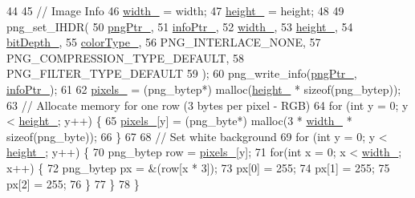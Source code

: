 \begin{DoxyCode}
44 
45     \textcolor{comment}{// Image Info}
46     \mbox{\hyperlink{class_image_a4c2d8a01ecf1b7438f57f93357080e08}{width\_}} = width;
47     \mbox{\hyperlink{class_image_a64a699c5bb8e8a18c6971a8032806dba}{height\_}} = height;
48 
49     png\_set\_IHDR(
50         \mbox{\hyperlink{class_image_aaf607d2596bac09b13370599d9ba6d8c}{pngPtr\_}}, 
51         \mbox{\hyperlink{class_image_a505878e5e19500e3cc1b940067faa584}{infoPtr\_}}, 
52         \mbox{\hyperlink{class_image_a4c2d8a01ecf1b7438f57f93357080e08}{width\_}}, 
53         \mbox{\hyperlink{class_image_a64a699c5bb8e8a18c6971a8032806dba}{height\_}}, 
54         \mbox{\hyperlink{class_image_ae472f0390f64eb5d49f858ce95e09ce8}{bitDepth\_}}, 
55         \mbox{\hyperlink{class_image_a94b0dece808a9f06ebb6f4394e8e3048}{colorType\_}}, 
56         PNG\_INTERLACE\_NONE, 
57         PNG\_COMPRESSION\_TYPE\_DEFAULT, 
58         PNG\_FILTER\_TYPE\_DEFAULT
59     );
60     png\_write\_info(\mbox{\hyperlink{class_image_aaf607d2596bac09b13370599d9ba6d8c}{pngPtr\_}}, \mbox{\hyperlink{class_image_a505878e5e19500e3cc1b940067faa584}{infoPtr\_}});
61 
62     \mbox{\hyperlink{class_image_a51351c8507499d09cb9667c20ef01faf}{pixels\_}} = (png\_bytep*) malloc(\mbox{\hyperlink{class_image_a64a699c5bb8e8a18c6971a8032806dba}{height\_}} * \textcolor{keyword}{sizeof}(png\_bytep));
63     \textcolor{comment}{// Allocate memory for one row (3 bytes per pixel - RGB)}
64     \textcolor{keywordflow}{for} (\textcolor{keywordtype}{int} y = 0; y < \mbox{\hyperlink{class_image_a64a699c5bb8e8a18c6971a8032806dba}{height\_}}; y++) \{
65         \mbox{\hyperlink{class_image_a51351c8507499d09cb9667c20ef01faf}{pixels\_}}[y] = (png\_byte*) malloc(3 * \mbox{\hyperlink{class_image_a4c2d8a01ecf1b7438f57f93357080e08}{width\_}} * \textcolor{keyword}{sizeof}(png\_byte));
66     \}
67 
68     \textcolor{comment}{// Set white background}
69     \textcolor{keywordflow}{for} (\textcolor{keywordtype}{int} y = 0; y < \mbox{\hyperlink{class_image_a64a699c5bb8e8a18c6971a8032806dba}{height\_}}; y++) \{
70         png\_bytep row = \mbox{\hyperlink{class_image_a51351c8507499d09cb9667c20ef01faf}{pixels\_}}[y];
71         \textcolor{keywordflow}{for}(\textcolor{keywordtype}{int} x = 0; x < \mbox{\hyperlink{class_image_a4c2d8a01ecf1b7438f57f93357080e08}{width\_}}; x++) \{
72             png\_bytep px = \&(row[x * 3]);
73             px[0] = 255;
74             px[1] = 255;
75             px[2] = 255;
76         \}
77     \}
78 \}
\end{DoxyCode}
\mbox{\label{class_image_a7d0a9bb68362e0ec28d5d2c600cc9b59}} 
